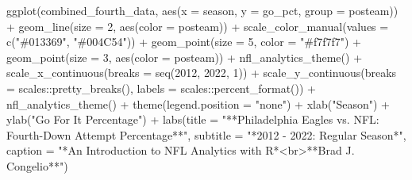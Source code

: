 \documentclass[
  letterpaper,
]{krantz}
\newenvironment{Shaded}{\begin{snugshade}}{\end{snugshade}}
\newcommand{\AttributeTok}[1]{\textcolor[rgb]{0.40,0.45,0.13}{#1}}
\newcommand{\DecValTok}[1]{\textcolor[rgb]{0.68,0.00,0.00}{#1}}
\newcommand{\FunctionTok}[1]{\textcolor[rgb]{0.28,0.35,0.67}{#1}}
\newcommand{\NormalTok}[1]{\textcolor[rgb]{0.00,0.23,0.31}{#1}}
\newcommand{\SpecialCharTok}[1]{\textcolor[rgb]{0.37,0.37,0.37}{#1}}
\newcommand{\StringTok}[1]{\textcolor[rgb]{0.13,0.47,0.30}{#1}}
\begin{document}
\begin{Shaded}
\begin{Highlighting}[]
\FunctionTok{ggplot}\NormalTok{(combined\_fourth\_data, }\FunctionTok{aes}\NormalTok{(}\AttributeTok{x =}\NormalTok{ season,}
                                 \AttributeTok{y =}\NormalTok{ go\_pct,}
                                 \AttributeTok{group =}\NormalTok{ posteam)) }\SpecialCharTok{+}
  \FunctionTok{geom\_line}\NormalTok{(}\AttributeTok{size =} \DecValTok{2}\NormalTok{, }\FunctionTok{aes}\NormalTok{(}\AttributeTok{color =}\NormalTok{ posteam)) }\SpecialCharTok{+}
  \FunctionTok{scale\_color\_manual}\NormalTok{(}\AttributeTok{values =} \FunctionTok{c}\NormalTok{(}\StringTok{"\#013369"}\NormalTok{, }\StringTok{"\#004C54"}\NormalTok{)) }\SpecialCharTok{+}
  \FunctionTok{geom\_point}\NormalTok{(}\AttributeTok{size =} \DecValTok{5}\NormalTok{, }\AttributeTok{color =} \StringTok{"\#f7f7f7"}\NormalTok{) }\SpecialCharTok{+}
  \FunctionTok{geom\_point}\NormalTok{(}\AttributeTok{size =} \DecValTok{3}\NormalTok{, }\FunctionTok{aes}\NormalTok{(}\AttributeTok{color =}\NormalTok{ posteam)) }\SpecialCharTok{+}
  \FunctionTok{nfl\_analytics\_theme}\NormalTok{() }\SpecialCharTok{+}
  \FunctionTok{scale\_x\_continuous}\NormalTok{(}\AttributeTok{breaks =} \FunctionTok{seq}\NormalTok{(}\DecValTok{2012}\NormalTok{, }\DecValTok{2022}\NormalTok{, }\DecValTok{1}\NormalTok{)) }\SpecialCharTok{+}
  \FunctionTok{scale\_y\_continuous}\NormalTok{(}\AttributeTok{breaks =}\NormalTok{ scales}\SpecialCharTok{::}\FunctionTok{pretty\_breaks}\NormalTok{(),}
                     \AttributeTok{labels =}\NormalTok{ scales}\SpecialCharTok{::}\FunctionTok{percent\_format}\NormalTok{()) }\SpecialCharTok{+}
  \FunctionTok{nfl\_analytics\_theme}\NormalTok{() }\SpecialCharTok{+}
  \FunctionTok{theme}\NormalTok{(}\AttributeTok{legend.position =} \StringTok{"none"}\NormalTok{) }\SpecialCharTok{+}
  \FunctionTok{xlab}\NormalTok{(}\StringTok{"Season"}\NormalTok{) }\SpecialCharTok{+}
  \FunctionTok{ylab}\NormalTok{(}\StringTok{"Go For It Percentage"}\NormalTok{) }\SpecialCharTok{+}
  \FunctionTok{labs}\NormalTok{(}\AttributeTok{title =} \StringTok{"**Philadelphia Eagles vs. NFL: Fourth{-}Down Attempt Percentage**"}\NormalTok{,}
       \AttributeTok{subtitle =} \StringTok{"*2012 {-} 2022: Regular Season*"}\NormalTok{,}
       \AttributeTok{caption =} \StringTok{"*An Introduction to NFL Analytics with R*\textless{}br\textgreater{}**Brad J. Congelio**"}\NormalTok{)}
\end{Highlighting}
\end{Shaded}
\end{document}
